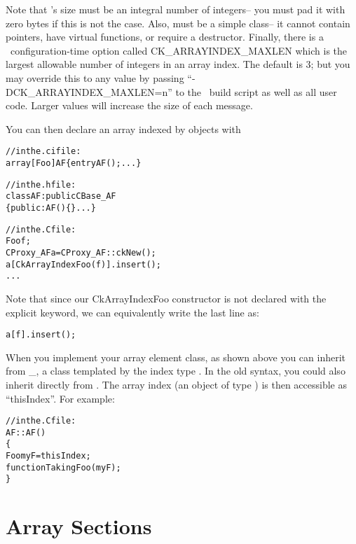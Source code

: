 Note that 's size must be an integral number of integers--
you must pad it with zero bytes if this is not the case.
Also,  must be a simple class-- it cannot contain 
pointers, have virtual functions, or require a destructor.
Finally, there is a \charmpp\ configuration-time option called
CK\_ARRAYINDEX\_MAXLEN  
which is the largest allowable number of 
integers in an array index.  The default is 3; but you may 
override this to any value by passing ``-DCK\_ARRAYINDEX\_MAXLEN=n'' 
to the \charmpp\ build script as well as all user code. Larger 
values will increase the size of each message.

You can then declare an array indexed by  objects with

\begin{alltt}
//in the .ci file:
array [Foo] AF \{ entry AF(); ... \}

//in the .h file:
class AF : public CBase\_AF
\{ public: AF() \{\} ... \}

//in the .C file:
    Foo f;
    CProxy_AF a=CProxy_AF::ckNew();
    a[CkArrayIndexFoo(f)].insert();
    ...
\end{alltt}

Note that since our CkArrayIndexFoo constructor is not declared
with the explicit keyword, we can equivalently write the last line as:

\begin{alltt}
    a[f].insert();
\end{alltt}

When you implement your array element class, as shown above you 
can inherit from \_, 
a class templated by the index type . In the old syntax,
you could also inherit directly from .
The array index (an object of type ) is then accessible as 
``thisIndex''. For example:

\begin{alltt}

//in the .C file:
AF::AF()
\{
    Foo myF=thisIndex;
    functionTakingFoo(myF);
\}
\end{alltt}


\section{Array Sections}
\label{array section}

